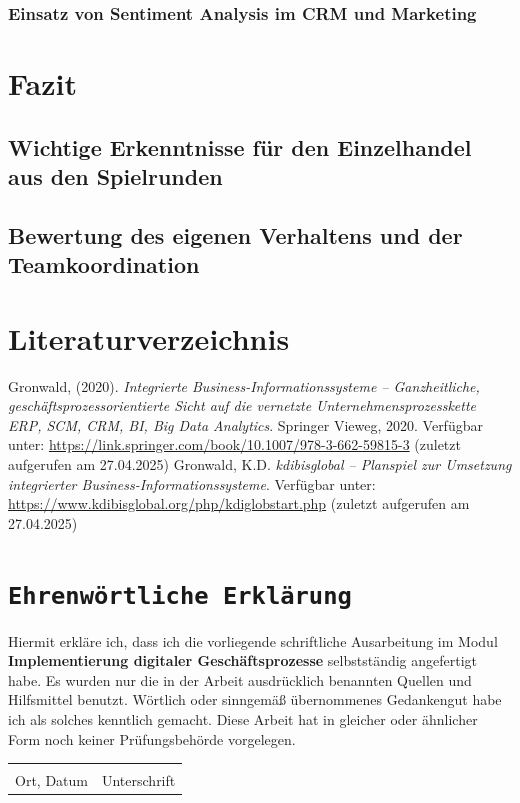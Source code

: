 \documentclass[a4paper,12pt]{article}
\begin{document}
\subsubsection{Einsatz von Sentiment Analysis im CRM und Marketing}

\newpage
\section{Fazit}
\subsection{Wichtige Erkenntnisse für den Einzelhandel aus den Spielrunden}
\subsection{Bewertung des eigenen Verhaltens und der Teamkoordination}

\newpage
{}
\section*{Literaturverzeichnis}
\begin{thebibliography}{99}
     Gronwald, (2020). \textit{Integrierte Business-Informationssysteme – Ganzheitliche, geschäftsprozessorientierte Sicht auf die vernetzte Unternehmensprozesskette ERP, SCM, CRM, BI, Big Data Analytics}. Springer Vieweg, 2020. Verfügbar unter: \url{https://link.springer.com/book/10.1007/978-3-662-59815-3} (zuletzt aufgerufen am 27.04.2025)
     Gronwald, K.D. \textit{kdibisglobal – Planspiel zur Umsetzung integrierter Business-Informationssysteme}. Verfügbar unter: \url{https://www.kdibisglobal.org/php/kdiglobstart.php} (zuletzt aufgerufen am 27.04.2025)
\end{thebibliography}


\newpage

\newpage
{}
\section*{\texttt{Ehrenwörtliche Erklärung}}
Hiermit erkläre ich, dass ich die vorliegende schriftliche Ausarbeitung im Modul \textbf{Implementierung digitaler Geschäftsprozesse} selbstständig
angefertigt habe. Es wurden nur die in der Arbeit ausdrücklich benannten Quellen und
Hilfsmittel benutzt. Wörtlich oder sinngemäß übernommenes Gedankengut habe ich als
solches kenntlich gemacht. Diese Arbeit hat in gleicher oder ähnlicher Form noch keiner
Prüfungsbehörde vorgelegen.

\vspace{3cm}
\noindent\begin{tabular}{p{}p{}}
    \hrulefill & \hrulefill \\
    Ort, Datum & Unterschrift \\
\end{tabular}
\end{document}
